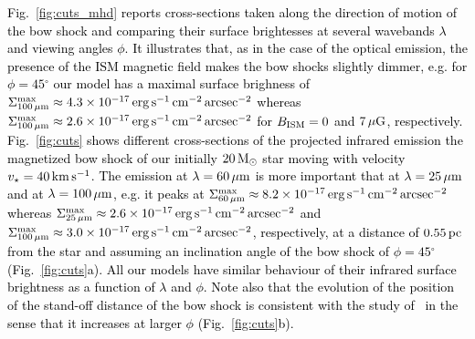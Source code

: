 \documentclass[useAMS,usenatbib]{mn2e}
\newcommand{\degree}{\ensuremath{^\circ}}
\begin{document}
\textcolor{black}{
Fig.~\ref{fig:cuts_mhd} reports cross-sections taken along the direction of 
motion of the bow shock and comparing their surface brightesses at several 
wavebands $\lambda$ and viewing angles $\phi$. It illustrates that, as in the 
case of the optical emission, the presence of the ISM magnetic field makes the 
bow shocks slightly dimmer, e.g. for $\phi=45\degree$ our model has a maximal 
surface brighness of $\Sigma^{\rm max}_{100\,\mu\rm m} \approx 4.3\times 
10^{-17}\, \rm erg\, \rm s^{-1}\, \rm cm^{-2}\, \rm arcsec^{-2}$ whereas 
$\Sigma^{\rm max}_{100\,\mu\rm m} \approx 2.6\times 10^{-17}\, \rm erg\, \rm 
s^{-1}\, \rm cm^{-2}\, \rm arcsec^{-2}$ for $B_{\rm ISM}=0$ and $7\, \mu\rm G$, 
respectively. Fig.~\ref{fig:cuts} shows different cross-sections of the 
projected infrared emission the magnetized bow shock of our initially $20\, \rm 
M_{\odot}$ star moving with velocity $v_{\star}=40\, \rm km\, \rm s^{-1}$. The 
emission at $\lambda=60\, \mu\rm m$ is more important that at $\lambda=25\, 
\mu\rm m$ and at $\lambda=100\, \mu\rm m$, e.g. it peaks at $\Sigma^{\rm 
max}_{60\,\mu\rm m} \approx 8.2 \times 10^{-17}\, \rm erg\, \rm s^{-1}\, \rm 
cm^{-2}\, \rm arcsec^{-2}$ whereas $\Sigma^{\rm max}_{25\,\mu\rm m} \approx 2.6 
\times 10^{-17}\, \rm erg\, \rm s^{-1}\, \rm cm^{-2}\, \rm arcsec^{-2}$ and 
$\Sigma^{\rm max}_{100\,\mu\rm m} \approx 3.0 \times 10^{-17}\, \rm erg\, \rm 
s^{-1}\, \rm cm^{-2}\, \rm arcsec^{-2}$, respectively, at a distance of $0.55\, 
\rm pc$ from the star and assuming an inclination angle of the bow shock of 
$\phi=45\degree$ (Fig.~\ref{fig:cuts}a). All our models have similar behaviour 
of their infrared surface brightness as a function of $\lambda$ and $\phi$. Note 
also that the evolution of the position of the stand-off distance of the bow 
shock is consistent with the study of~\citet{acreman_mnras_456_2016} in the 
sense that it increases at larger $\phi$ (Fig.~\ref{fig:cuts}b). 
}




\end{document}
